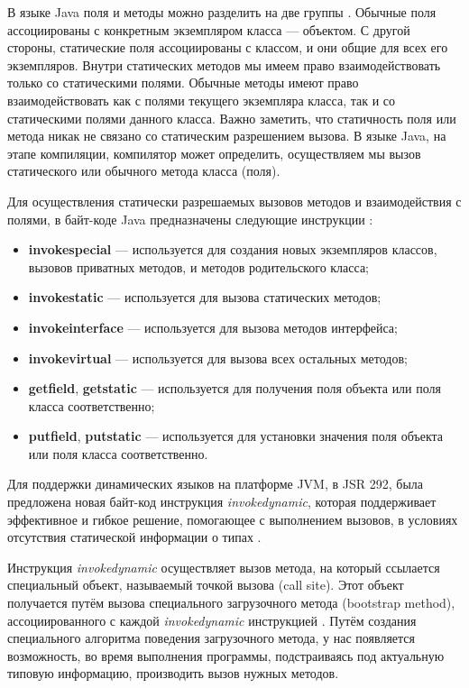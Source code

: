 В языке Java поля и методы можно разделить на две группы \cite{java:horstmann2012core}. Обычные поля ассоциированы с конкретным экземпляром класса --- объектом. С другой стороны, статические поля ассоциированы с классом, и они общие для всех его экземпляров. Внутри статических методов мы имеем право взаимодействовать только со статическими полями. Обычные методы имеют право взаимодействовать как с полями текущего экземпляра класса, так и со статическими полями данного класса. Важно заметить, что статичность поля или метода никак не связано со статическим разрешением вызова. В языке Java, на этапе компиляции, компилятор может определить, осуществляем мы вызов статического или обычного метода класса (поля). %

Для осуществления статически разрешаемых вызовов методов и взаимодействия с полями, в байт-коде Java предназначены следующие инструкции \cite{book:yellin1996java}:

\begin{itemize}
    \item \textbf{invokespecial} --- используется для создания новых экземпляров классов, вызовов приватных методов, и методов родительского класса;
    \item \textbf{invokestatic} --- используется для вызова статических методов;
    \item \textbf{invokeinterface} --- используется для вызова методов интерфейса;
    \item \textbf{invokevirtual} --- используется для вызова всех остальных методов;
    \item \textbf{getfield}, \textbf{getstatic} --- используется для получения поля объекта или поля класса соответственно;
    \item \textbf{putfield}, \textbf{putstatic} --- используется для установки значения поля объекта или поля класса соответственно.
\end{itemize}


Для поддержки динамических языков на платформе JVM, в JSR 292, была предложена новая байт-код инструкция \textit{invokedynamic}, которая поддерживает эффективное и гибкое решение, помогающее с выполнением вызовов, в условиях отсутствия статической информации о типах \cite{java:JSR292rosejsr}.

Инструкция \textit{invokedynamic} осуществляет вызов метода, на который ссылается специальный объект, называемый точкой вызова (call site). Этот объект получается путём вызова специального загрузочного метода (bootstrap method), ассоциированного с каждой \textit{invokedynamic} инструкцией \cite{book:yellin1996java}. Путём создания специального алгоритма поведения загрузочного метода, у нас появляется возможность, во время выполнения программы, подстраиваясь под актуальную типовую информацию, производить вызов нужных методов.



